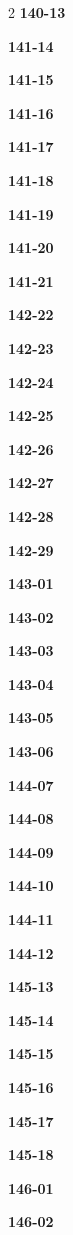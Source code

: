 \documentclass[10pt,a4paper]{article}
\begin{document}
\begin{multicols}{2}
\noindent\textbf{140-13}\ \par
\noindent\textbf{141-14}\ \par
\noindent\textbf{141-15}\ \par
\noindent\textbf{141-16}\ \par
\noindent\textbf{141-17}\ \par
\noindent\textbf{141-18}\ \par
\noindent\textbf{141-19}\ \par
\noindent\textbf{141-20}\ \par
\noindent\textbf{141-21}\ \par
\noindent\textbf{142-22}\ \par
\noindent\textbf{142-23}\ \par
\noindent\textbf{142-24}\ \par
\noindent\textbf{142-25}\ \par
\noindent\textbf{142-26}\ \par
\noindent\textbf{142-27}\ \par
\noindent\textbf{142-28}\ \par
\noindent\textbf{142-29}\ \par
\noindent\textbf{143-01}\ \par
\noindent\textbf{143-02}\ \par
\noindent\textbf{143-03}\ \par
\noindent\textbf{143-04}\ \par
\noindent\textbf{143-05}\ \par
\noindent\textbf{143-06}\ \par
\noindent\textbf{144-07}\ \par
\noindent\textbf{144-08}\ \par
\noindent\textbf{144-09}\ \par
\noindent\textbf{144-10}\ \par
\noindent\textbf{144-11}\ \par
\noindent\textbf{144-12}\ \par
\noindent\textbf{145-13}\ \par
\noindent\textbf{145-14}\ \par
\noindent\textbf{145-15}\ \par
\noindent\textbf{145-16}\ \par
\noindent\textbf{145-17}\ \par
\noindent\textbf{145-18}\ \par
\noindent\textbf{146-01}\ \par
\noindent\textbf{146-02}\ \par

\end{multicols}
\end{document}
